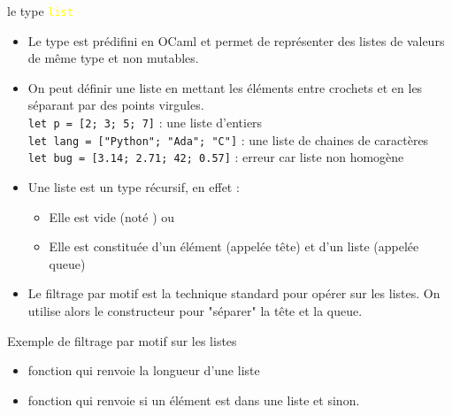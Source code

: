 \documentclass[10pt]{beamer}
\begin{document}
\begin{frame}{\Ctitle}{\stitle}
	\begin{block}{le type \textcolor{yellow}{\tt list}}
		\begin{itemize}
			\item<1-> Le type  est prédifini en OCaml et permet de représenter des listes de valeurs \textcolor{BrickRed}{de même type} et \textcolor{BrickRed}{non mutables}.
			\item<2-> On peut définir une liste en mettant les éléments entre crochets et en les séparant par des points virgules.\\
			\onslide<3-> \texttt{let p = [2; 3; 5; 7]} : une liste d'entiers \\
			\onslide<4-> \texttt{let lang = ["Python"; "Ada"; "C"]} : une liste de chaines de caractères \\
			\onslide<5-> \texttt{let bug = [3.14; 2.71; 42; 0.57]} : erreur car liste non homogène
			\item<6-> Une liste est un type récursif, en effet :
			\begin{itemize}
				\item<7-> Elle est vide (noté \kw{[]}) ou
				\item<8-> Elle est constituée d'un élément (appelée tête) et d'un liste (appelée queue)
			\end{itemize}
			\item<9-> Le filtrage par motif est la technique standard pour opérer sur les listes. On utilise alors le constructeur \kw{::} pour "séparer" la tête et la queue.
		\end{itemize}
	\end{block}
\end{frame}

\begin{frame}{\Ctitle}{\stitle}
	\begin{exampleblock}{Exemple de filtrage par motif sur les listes}
		\begin{itemize}
			\item<1-> fonction qui renvoie la longueur d'une liste
			\onslide<2->
			\item<3-> fonction qui renvoie  si un élément est dans une liste et  sinon.
			\onslide<4->
		\end{itemize}
	\end{exampleblock}
\end{frame}
\end{document}
